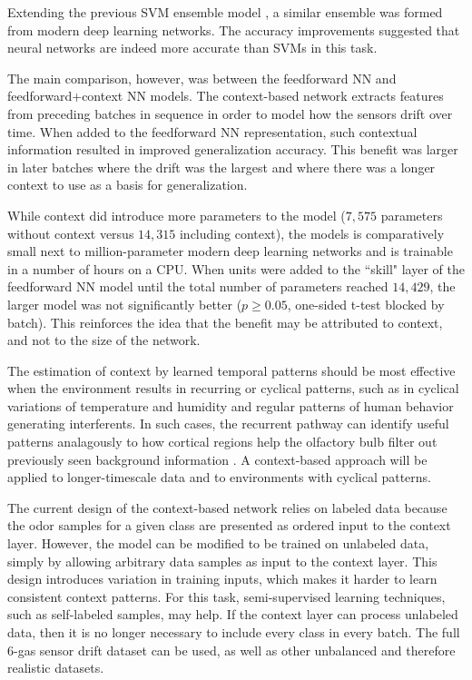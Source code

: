 \documentclass[onecolumn,pre,floats,aps,amsmath,amssymb,superscriptaddress]{revtex4-1}
\begin{document}
Extending the previous SVM ensemble model \cite{vergara_chemical_2012}, a similar ensemble was formed from modern deep learning networks. The accuracy improvements suggested that neural networks are indeed more accurate than SVMs in this task.

The main comparison, however, was between the feedforward NN and feedforward+context NN models. The context-based network extracts features from preceding batches in sequence in order to model how the sensors drift over time. When added to the feedforward NN representation, such contextual information resulted in improved generalization accuracy. This benefit was larger in later batches where the drift was the largest and where there was a longer context to use as a basis for generalization.

While context did introduce more parameters to the model ($7{,}575$ parameters without context versus $14{,}315$ including context), the models is comparatively small next to million-parameter modern deep learning networks and is trainable in a number of hours on a CPU. When units were added to the ``skill" layer of the feedforward NN model until the total number of parameters reached $14{,}429$, the larger model was not significantly better ($p\geq 0.05$, one-sided t-test blocked by batch). This reinforces the idea that the benefit may be attributed to context, and not to the size of the network.

The estimation of context by learned temporal patterns should be most effective when the environment results in recurring or cyclical patterns, such as in cyclical variations of temperature and humidity and regular patterns of human behavior generating interferents. In such cases, the recurrent pathway can identify useful patterns analagously to how cortical regions help the olfactory bulb filter out previously seen background information \cite{adams_top-down_2019}. A context-based approach will be applied to longer-timescale data and to environments with cyclical patterns. 

The current design of the context-based network relies on labeled data because the odor samples for a given class are presented as ordered input to the context layer. However, the model can be modified to be trained on unlabeled data, simply by allowing arbitrary data samples as input to the context layer. This design introduces variation in training inputs, which makes it harder to learn consistent context patterns. For this task, semi-supervised learning techniques, such as self-labeled samples, may help. If the context layer can process unlabeled data, then it is no longer necessary to include every class in every batch. The full 6-gas sensor drift dataset can be used, as well as other unbalanced and therefore realistic datasets.
\end{document}
